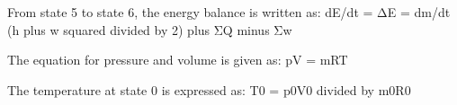 From state 5 to state 6, the energy balance is written as:  
dE/dt = ΔE = dm/dt (h plus w squared divided by 2) plus ΣQ minus Σw  

The equation for pressure and volume is given as:  
pV = mRT  

The temperature at state 0 is expressed as:  
T0 = p0V0 divided by m0R0